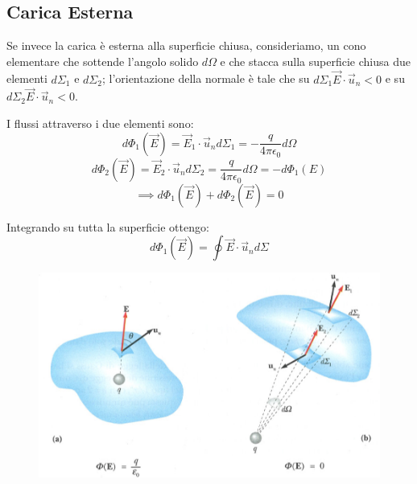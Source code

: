 \documentclass[class=book, crop=false, oneside, 12pt]{standalone}
\begin{document}
\subsection{Carica Esterna}

Se invece la carica è esterna alla superficie chiusa, consideriamo, un cono elementare che sottende l'angolo solido \(d \Omega\) e che stacca sulla superficie chiusa due elementi \(d \Sigma_1\) e \(d \Sigma_2\);
l'orientazione della normale è tale che su \(d \Sigma_1 \overrightarrow{E} \cdot \overrightarrow{u}_n <0 \) e su \(d \Sigma_2 \overrightarrow{E} \cdot \overrightarrow{u}_n <0\). 

I flussi attraverso i due elementi sono: 
\begin{equation*}
    d \Phi_1 (\overrightarrow{E}) = \overrightarrow{E}_1 \cdot \overrightarrow{u}_n d \Sigma_1 = - \frac{q}{4 \pi \epsilon_0} d \Omega
\end{equation*}
\begin{equation*}
    d \Phi_2 (\overrightarrow{E}) = \overrightarrow{E}_2 \cdot \overrightarrow{u}_n d \Sigma_2 = \frac{q}{4 \pi \epsilon_0} d \Omega = - d \Phi_1 (E)
\end{equation*}
\begin{equation*}
    \implies d \Phi_1 (\overrightarrow{E}) + d \Phi_2 (\overrightarrow{E}) = 0
\end{equation*}

Integrando su tutta la superficie ottengo:
\begin{equation} \label{flusso_carica_esterna}
    d \Phi_1 (\overrightarrow{E}) = \oint \overrightarrow{E} \cdot \overrightarrow{u}_n d \Sigma
\end{equation}

\begin{figure}[h]
    \includegraphics[scale=0.4]{flusso_carica_int_est.png}
    \centering
    \caption{}
\end{figure}
\end{document}
